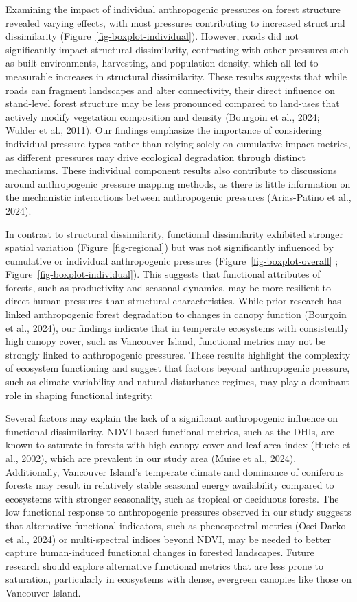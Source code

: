\documentclass[
]{agujournal2019}
\begin{document}
Examining the impact of individual anthropogenic pressures on forest
structure revealed varying effects, with most pressures contributing to
increased structural dissimilarity
(Figure~\ref{fig-boxplot-individual}). However, roads did not
significantly impact structural dissimilarity, contrasting with other
pressures such as built environments, harvesting, and population
density, which all led to measurable increases in structural
dissimilarity. These results suggests that while roads can fragment
landscapes and alter connectivity, their direct influence on stand-level
forest structure may be less pronounced compared to land-uses that
actively modify vegetation composition and density (Bourgoin et al.,
2024; Wulder et al., 2011). Our findings emphasize the importance of
considering individual pressure types rather than relying solely on
cumulative impact metrics, as different pressures may drive ecological
degradation through distinct mechanisms. These individual component
results also contribute to discussions around anthropogenic pressure
mapping methods, as there is little information on the mechanistic
interactions between anthropogenic pressures (Arias-Patino et al.,
2024).

In contrast to structural dissimilarity, functional dissimilarity
exhibited stronger spatial variation (Figure~\ref{fig-regional}) but was
not significantly influenced by cumulative or individual anthropogenic
pressures (Figure~\ref{fig-boxplot-overall} ;
Figure~\ref{fig-boxplot-individual}). This suggests that functional
attributes of forests, such as productivity and seasonal dynamics, may
be more resilient to direct human pressures than structural
characteristics. While prior research has linked anthropogenic forest
degradation to changes in canopy function (Bourgoin et al., 2024), our
findings indicate that in temperate ecosystems with consistently high
canopy cover, such as Vancouver Island, functional metrics may not be
strongly linked to anthropogenic pressures. These results highlight the
complexity of ecosystem functioning and suggest that factors beyond
anthropogenic pressure, such as climate variability and natural
disturbance regimes, may play a dominant role in shaping functional
integrity.

Several factors may explain the lack of a significant anthropogenic
influence on functional dissimilarity. NDVI-based functional metrics,
such as the DHIs, are known to saturate in forests with high canopy
cover and leaf area index (Huete et al., 2002), which are prevalent in
our study area (Muise et al., 2024). Additionally, Vancouver Island's
temperate climate and dominance of coniferous forests may result in
relatively stable seasonal energy availability compared to ecosystems
with stronger seasonality, such as tropical or deciduous forests. The
low functional response to anthropogenic pressures observed in our study
suggests that alternative functional indicators, such as phenospectral
metrics (Osei Darko et al., 2024) or multi-spectral indices beyond NDVI,
may be needed to better capture human-induced functional changes in
forested landscapes. Future research should explore alternative
functional metrics that are less prone to saturation, particularly in
ecosystems with dense, evergreen canopies like those on Vancouver
Island.
\end{document}
